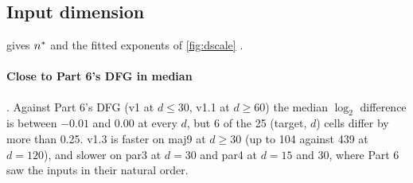 \subsection{Input dimension}\label{app:dscale}

 gives $\nstar$ and the fitted exponents of \cref{fig:dscale} .

\paragraph{Close to Part 6's DFG in median} . Against Part 6's DFG (v1 at $d\le30$, v1.1 at $d\ge60$) the median $\log_2$ difference is between $-0.01$ and 0.00 at every $d$, but 6 of the 25 (target, $d$) cells differ by more than 0.25. v1.3 is faster on maj9 at $d\ge30$ (up to 104 against 439 at $d=120$), and slower on par3 at $d=30$ and par4 at $d=15$ and 30, where Part 6 saw the inputs in their natural order.

\begin{table}[t]
\centering{\footnotesize\setlength{\tabcolsep}{2.7pt}
}
\caption{$\nstar$ against the input dimension $d$ on the  targets that the networks were trained on at $d=15$, 60 and 120 . DFG v1.3 alone (inputs permuted per fit) and the networks  (square loss, the only variant run at every $d$); ``--'': not run. Seeds 0, 1 at $d\ne30$ and 0, 1, 2 at $d=30$ for both. The networks were trained for 20000 steps, 40000 at $d=120$. Their grid extends to 65536 at $d=60$ and is 64--8192 (maj9, par2), 256--32768 (mux) and 512--65536 (par3) at $d=120$; $\nstar$ on the full grid equals the 16--16384 value everywhere. Exponent: the least-squares slope of $\log\nstar$ on $\log d$ over the $d$ at which both reach 10\% error ($^\ast$: $d=15$--60 only). Bottom, per $d$: the median $\log_2$ ratio of DFG v1.3 to the networks (factor $2^{-\rm median}$), the median $\log_2$ ratio of DFG v1.3 to Part 6's DFG (v1 at $d\le30$, v1.1 at $d\ge60$, natural column order), DFG v1.3's largest FLOPs per fit on these targets, and the number of seeds. Source:  (\texttt{q4\_dscale}); DFG's runs: \texttt{toy\_\_dfg13-perm\_\_designed\_d<d>.json} in  and .}
\label{tab:dscale}
\end{table}

